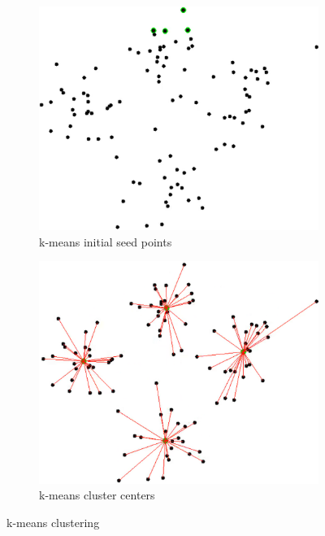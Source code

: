 \begin{figure}[h!]
	\centering
	\begin{subfigure}{0.45\textwidth}
		\includegraphics[scale=0.4]{images/kmeansSeeds.png}
		\caption{k-means initial seed points \cite{shabalinKmeansClusteringKmeans2024}}\label{fig:kmeans1}
	\end{subfigure}
	\centering
	\begin{subfigure}{0.45\textwidth}
		\includegraphics[scale=0.4]{images/kmeansClusters.png}
		\caption{k-means cluster centers \cite{shabalinKmeansClusteringKmeans2024}}\label{fig:kmeans2}
	\end{subfigure}
	\caption{k-means clustering}\label{fig:kmeans}
\end{figure}

